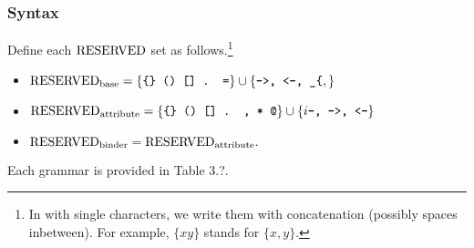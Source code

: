 \subsubsection*{Syntax}
Define each $\mathrm{RESERVED}$ set as follows.\footnote{In with single characters, we write them with concatenation (possibly spaces inbetween). For example, $\{x y\}$ stands for $\{x, y\}.$}
\begin{itemize}
\item $\mathrm{RESERVED}_{\textrm{base}} = \{\texttt{\{\} () [] . =}\} \cup \{\texttt{->, <-, \_\{},\} $
  \item $\mathrm{RESERVED}_{\textrm{attribute}} = \{\texttt{\{\} () [] . , * @}\} \cup \{i\texttt{--, ->, <-}\}$ %
\item $\mathrm{RESERVED}_{\textrm{binder}} = \mathrm{RESERVED}_{\textrm{attribute}}.$
\end{itemize}
Each grammar is provided in Table 3.?.


